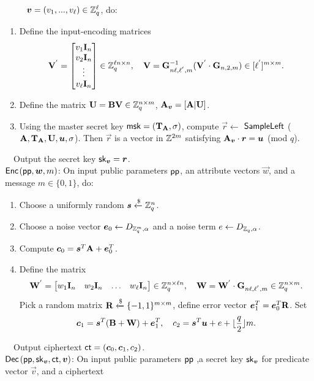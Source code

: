 ~~~~~$\boldsymbol{v}=(v_{1},...,v_{\ell}) \in \mathbb{Z}^{\ell}_{q}$, do:
\begin{enumerate}
\item Define the input-encoding matrices
\begin{equation}
\mathbf{V}^{'}= \begin{bmatrix}
v_{1} \textbf{I}_{n}\\
v_{2} \textbf{I}_{n}\\
\vdots\\
v_{\ell} \textbf{I}_{n}
\end{bmatrix} \in \mathbb{Z}^{\ell n \times n}_{q},~~~ \mathbf{V}=\mathbf{G}^{-1}_{n\ell,\ell^{'},m}(\mathbf{V}^{'}\cdot \mathbf{G}_{n,2,m}) \in [\ell^{'}]^{m \times m}.
\end{equation}

\item Define the  matrix $\mathbf{U}=\mathbf{BV} \in \mathbb{Z}^{n \times m}_{q}$, $\mathbf{A}_{\boldsymbol{v}}=[\mathbf{A}|\mathbf{U}]$.\

\item Using the master secret key $\mathsf{msk}=(\mathbf{T}_{\mathbf{A}},\sigma)$, compute $\vec{r}\leftarrow$ $\mathsf{SampleLeft}$ ($\textbf{A}, \mathbf{T}_{\mathbf{A}},\mathbf{U}, \boldsymbol{u},\sigma$). Then $\vec{r}$ is a vector in $\mathbb{Z}^{2m}$ satisfying $\mathbf{A}_{\boldsymbol{v}}\cdot \boldsymbol{r}=\boldsymbol{u}$ (mod $q$).
\end{enumerate}
~~Output the secret key  $\mathsf{sk}_{\boldsymbol{v}}=\boldsymbol{r}$.\\[0.4cm]
$\mathsf{Enc}$$(\mathsf{pp},\boldsymbol{w},m)$: On input public parameters $\mathsf{pp}$, an attribute vectors $\vec{w}$, and a message $m \in \{0,1\}$, do:
\begin{enumerate}
\item Choose a uniformly random $\boldsymbol{s}\xleftarrow{\$} \mathbb{Z}^{n}_{q}$.\

\item Choose a noise vector $\boldsymbol{e}_{0}\leftarrow D_{\mathbb{Z}^{m}_{q},\alpha}$ and a noise term $e\leftarrow D_{\mathbb{Z}_{q},\alpha}$.\

\item Compute $\boldsymbol{c}_{0}=\boldsymbol{s}^{T}\mathbf{A}+\boldsymbol{e}^{T}_{0}$.

\item Define the matrix
\begin{equation}
\mathbf{W}^{'}= \begin{bmatrix}
w_{1} \mathbf{I}_{n}&w_{2} \mathbf{I}_{n}&\ldots&w_{\ell} \mathbf{I}_{n}
\end{bmatrix} \in \mathbb{Z}^{n \times \ell n}_{q},~~~ \mathbf{W}=\mathbf{W}^{'}\cdot \mathbf{G}_{n\ell,\ell^{'},m} \in \mathbb{Z}^{n \times m}_{q}.
\end{equation}
Pick a random matrix $\mathbf{R}\xleftarrow{\$} \{-1,1\}^{m \times m}$, define error vector $\boldsymbol{e}^{T}_{1}=\boldsymbol{e}^{T}_{0}\mathbf{R}$. Set
\begin{equation}
\boldsymbol{c}_{1}=\boldsymbol{s}^{T}(\mathbf{B}+\mathbf{W})+\boldsymbol{e}^{T}_{1},~~~c_{2}=\boldsymbol{s}^{T}\boldsymbol{u}+e+\lfloor \frac{q}{2} \rfloor m.
\end{equation}
\end{enumerate}
~~Output ciphertext  $\mathsf{ct}=(\boldsymbol{c}_{0},\boldsymbol{c}_{1},c_{2})$.\\[0.4cm]
$\mathsf{Dec}$$(\mathsf{pp},\mathsf{sk}_{\boldsymbol{v}},\mathsf{ct},\boldsymbol{v})$: On input public parameters $\mathsf{pp}$ ,a secret key $\mathsf{sk}_{\boldsymbol{v}}$ for predicate vector $\vec{v}$, and a ciphertext

